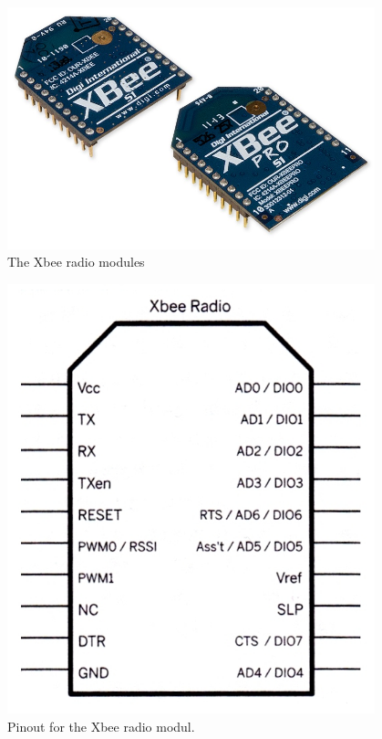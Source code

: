 \begin{minipage}{\linewidth}
	\centering
	\begin{minipage}{0.45\linewidth}      
		\begin{figure}[H]
			\centering
			\includegraphics[width=0.95\textwidth]{figures/Xbee}
			\caption{The Xbee radio modules} 
			\label{XbeeLook}
		\end{figure}
	\end{minipage}
	\hspace{0.03\linewidth}
	\begin{minipage}{0.45\linewidth}
		\begin{figure}[H]
			\centering
			\includegraphics[width=0.95\textwidth]{figures/XbeeIO}
			\caption{Pinout for the Xbee radio modul.} 
			\label{Xbeepinout}
		\end{figure}
	\end{minipage}
\end{minipage}

